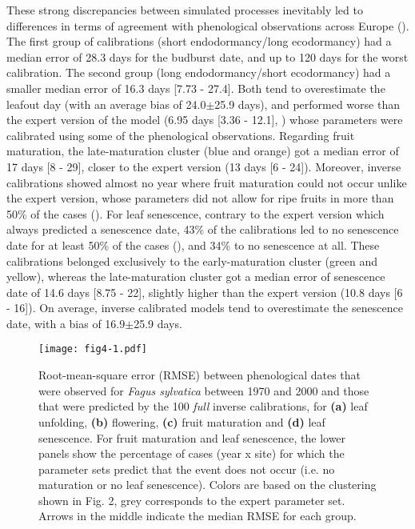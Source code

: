 \documentclass[preprint,12pt,authoryear]{elsarticle}
\begin{document}
These strong discrepancies between simulated processes inevitably led to differences in terms of agreement with phenological observations across Europe (). The first group of calibrations (short endodormancy/long ecodormancy) had a median error of 28.3 days for the budburst date, and up to 120 days for the worst calibration. The second group (long endodormancy/short ecodormancy) had a smaller median error of 16.3 days [7.73 - 27.4]. \textcolor{customred}{Both tend to overestimate the leafout day (with an average bias of 24.0$\pm$25.9 days), and} performed worse than the expert version of the model (6.95 days [3.36 - 12.1], ) whose parameters were calibrated using some of the phenological observations. Regarding fruit maturation, the late-maturation cluster (blue and orange) got a median error of 17 days [8 - 29], closer to the expert version (13 days [6 - 24]). Moreover, inverse calibrations showed almost no year where fruit maturation could not occur unlike the expert version, whose parameters did not allow for ripe fruits in more than 50\% of the cases (). For leaf senescence, contrary to the expert version which always predicted a senescence date, 43\% of the calibrations led to no senescence date for at least 50\% of the cases (), and 34\% to no senescence at all. These calibrations belonged exclusively to the early-maturation cluster (green and yellow), whereas the late-maturation cluster got a median error of senescence date of 14.6 days [8.75 - 22], slightly higher than the expert version (10.8 days [6 - 16]). \textcolor{customred}{On average, inverse calibrated models tend to overestimate the senescence date, with a bias of 16.9$\pm$25.9 days.}

\begin{figure}
\centering
\begin{subcaptiongroup}
\label{fig:3A} 
\label{fig:3B}
\label{fig:3C}
\label{fig:3D}
\label{fig:3E}
\end{subcaptiongroup}
\centerline{\texttt{[image: fig4-1.pdf]}}
\caption{Root-mean-square error (RMSE) between phenological dates that were observed for \emph{Fagus sylvatica} between 1970 and 2000 and those that were predicted by the 100 \emph{full} inverse calibrations, for \textbf{(a)} leaf unfolding, \textbf{(b)} flowering, \textbf{(c)} fruit maturation and \textbf{(d)} leaf senescence. For fruit maturation and leaf senescence, the lower panels show the percentage of cases (year x site) for which the parameter sets predict that the event does not occur (i.e. no maturation or no leaf senescence). Colors are based on the clustering shown in Fig. 2, grey corresponds to the expert parameter set. Arrows in the middle indicate the median RMSE for each group.}
\label{fig:3}
\end{figure}
\end{document}

